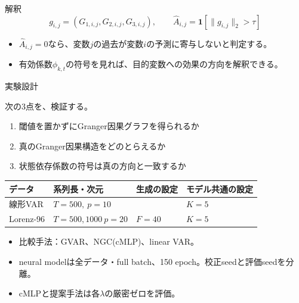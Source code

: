 \documentclass[dvipdfmx,11pt]{beamer}
\begin{document}
\begin{frame}{解釈}
  \vspace{0.4em}
  \[
    g_{i,j}
    =
    (G_{1,i,j},G_{2,i,j},G_{3,i,j}),
    \qquad
    \hat{A}_{i,j}
    =
    \mathbf{1}
    \left[
      \|g_{i,j}\|_2 > \tau
    \right]
  \]

  \vspace{-0.4em}
  \center
  \scriptsize
  \begin{itemize}
    \item $\hat{A}_{i,j}=0$なら、変数$j$の過去が変数$i$の予測に寄与しないと判定する。
    \item 有効係数$\phi_{k,t}$の符号を見れば、目的変数への効果の方向を解釈できる。
  \end{itemize}
 
\end{frame}

\begin{frame}{実験設計}
\small

次の3点を、検証する。
\begin{enumerate}
  \item 閾値を置かずにGranger因果グラフを得られるか
  \item 真のGranger因果構造をどのとらえるか
  \item 状態依存係数の符号は真の方向と一致するか
\end{enumerate}

\begin{table}
\centering
\scriptsize
\begin{tabular}{llll}
\toprule
データ & 系列長・次元 & 生成の設定&モデル共通の設定 \\
\midrule
線形VAR & $T=500,\ p=10$ &  & $K=5$ \\
Lorenz-96 & $T=500,1000\ p=20$ & $F=40$ & $K=5$\\
\bottomrule
\end{tabular}
\end{table}

\begin{itemize}
  \item 比較手法：GVAR、NGC(cMLP)、linear VAR。
  \item neural modelは全データ・full batch、150 epoch。校正seedと評価seedを分離。
  \item cMLPと提案手法は各$\lambda$の厳密ゼロを評価。
\end{itemize}
\end{frame}
\end{document}
